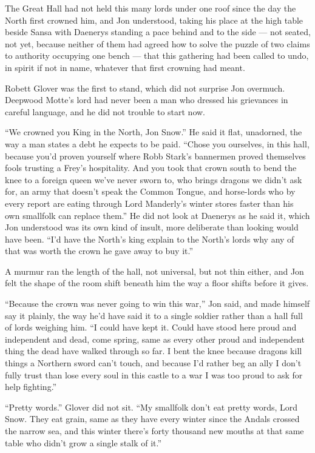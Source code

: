 The Great Hall had not held this many lords under one roof since the day the North first crowned him, and Jon understood, taking his place at the high table beside Sansa with Daenerys standing a pace behind and to the side — not seated, not yet, because neither of them had agreed how to solve the puzzle of two claims to authority occupying one bench — that this gathering had been called to undo, in spirit if not in name, whatever that first crowning had meant.

Robett Glover was the first to stand, which did not surprise Jon overmuch. Deepwood Motte’s lord had never been a man who dressed his grievances in careful language, and he did not trouble to start now.

“We crowned you King in the North, Jon Snow.” He said it flat, unadorned, the way a man states a debt he expects to be paid. “Chose you ourselves, in this hall, because you’d proven yourself where Robb Stark’s bannermen proved themselves fools trusting a Frey’s hospitality. And you took that crown south to bend the knee to a foreign queen we’ve never sworn to, who brings dragons we didn’t ask for, an army that doesn’t speak the Common Tongue, and horse-lords who by every report are eating through Lord Manderly’s winter stores faster than his own smallfolk can replace them.” He did not look at Daenerys as he said it, which Jon understood was its own kind of insult, more deliberate than looking would have been. “I’d have the North’s king explain to the North’s lords why any of that was worth the crown he gave away to buy it.”

A murmur ran the length of the hall, not universal, but not thin either, and Jon felt the shape of the room shift beneath him the way a floor shifts before it gives.

“Because the crown was never going to win this war,” Jon said, and made himself say it plainly, the way he’d have said it to a single soldier rather than a hall full of lords weighing him. “I could have kept it. Could have stood here proud and independent and dead, come spring, same as every other proud and independent thing the dead have walked through so far. I bent the knee because dragons kill things a Northern sword can’t touch, and because I’d rather beg an ally I don’t fully trust than lose every soul in this castle to a war I was too proud to ask for help fighting.”

“Pretty words.” Glover did not sit. “My smallfolk don’t eat pretty words, Lord Snow. They eat grain, same as they have every winter since the Andals crossed the narrow sea, and this winter there’s forty thousand new mouths at that same table who didn’t grow a single stalk of it.”

